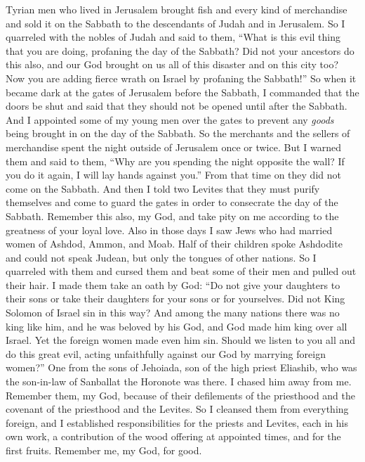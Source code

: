 \begin{biblechapter}
\verse Tyrian men who lived in Jerusalem brought fish and every kind of merchandise and sold it on the Sabbath to the descendants of Judah and in Jerusalem.
\verse So I quarreled with the nobles of Judah and said to them, “What is this evil thing that you are doing, profaning the day of the Sabbath?
\verse Did not your ancestors do this also, and our God brought on us all of this disaster and on this city too? Now you are adding fierce wrath on Israel by profaning the Sabbath!”
\verse So when it became dark at the gates of Jerusalem before the Sabbath, I commanded that the doors be shut and said that they should not be opened until after the Sabbath. And I appointed some of my young men over the gates to prevent any \textit{goods} being brought in on the day of the Sabbath.
\verse So the merchants and the sellers of merchandise spent the night outside of Jerusalem once or twice.
\verse But I warned them and said to them, “Why are you spending the night opposite the wall? If you do it again, I will lay hands against you.” From that time on they did not come on the Sabbath.
\verse And then I told two Levites that they must purify themselves and come to guard the gates in order to consecrate the day of the Sabbath. Remember this also, my God, and take pity on me according to the greatness of your loyal love.
 Also in those days I saw Jews who had married women of Ashdod, Ammon, and Moab.
\verse Half of their children spoke Ashdodite and could not speak Judean, but only the tongues of other nations.
\verse So I quarreled with them and cursed them and beat some of their men and pulled out their hair. I made them take an oath by God: “Do not give your daughters to their sons or take their daughters for your sons or for yourselves.
\verse Did not King Solomon of Israel sin in this way? And among the many nations there was no king like him, and he was beloved by his God, and God made him king over all Israel. Yet the foreign women made even him sin.
\verse Should we listen to you all and do this great evil, acting unfaithfully against our God by marrying foreign women?”
\verse One from the sons of Jehoiada, son of the high priest Eliashib, who was the son-in-law of Sanballat the Horonote was there. I chased him away from me.
\verse Remember them, my God, because of their defilements of the priesthood and the covenant of the priesthood and the Levites.
\verse So I cleansed them from everything foreign, and I established responsibilities for the priests and Levites, each in his own work,
\verse a contribution of the wood offering at appointed times, and for the first fruits. Remember me, my God, for good.
\end{biblechapter}


